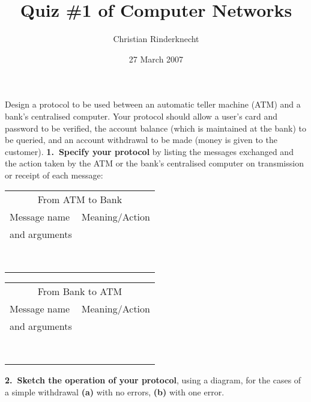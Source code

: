 \documentclass[11pt,a4paper]{article}
\title{Quiz \#1 of Computer Networks}
\author{Christian Rinderknecht}
\date{27 March 2007}
\begin{document}
\maketitle

\noindent Design a protocol to be used between an automatic teller
machine (ATM) and a bank's centralised computer. Your protocol should
allow a user's card and password to be verified, the account balance
(which is maintained at the bank) to be queried, and an account
withdrawal to be made (money is given to the
customer). \textbf{1.~Specify your protocol} by listing the messages
exchanged and the action taken by the ATM or the bank's centralised
computer on transmission or receipt of each message:
\begin{center}
\begin{tabular}{@{}p{170pt}p{170pt}@{}}
\toprule
\multicolumn{2}{c}{From ATM to Bank}\\
\cmidrule(r{0pt}){1-2}
Message name & Meaning/Action\\
and arguments &\\
\midrule
 & \\
 & \\
 & \\
 & \\
 & \\
 & \\
 & \\
 & \\
\bottomrule
\end{tabular}

\begin{tabular}{@{}p{170pt}p{170pt}@{}}
\toprule
\multicolumn{2}{c}{From Bank to ATM}\\
\cmidrule(r{0pt}){1-2}
Message name & Meaning/Action\\
and arguments &\\
\midrule
 & \\
 & \\
 & \\
 & \\
 & \\
 & \\
 & \\
 & \\
\bottomrule
\end{tabular}
\end{center}
\noindent\textbf{2.~Sketch the operation of your protocol}, using a
diagram, for the cases of a simple withdrawal \textbf{(a)} with no
errors, \textbf{(b)} with one error.
\end{document}
